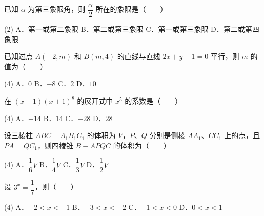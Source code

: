 
\begin{question}
已知 $\alpha$ 为第三象限角，则 $\dfrac{\alpha}{2}$ 所在的象限是\mbox{（　　）}

\begin{gkopts}(2)
\task A．第一或第二象限
\task B．第二或第三象限
\task C．第一或第三象限
\task D．第二或第四象限
\end{gkopts}

\end{question}
\begin{question}
已知过点 $A(-2, m)$ 和 $B(m, 4)$ 的直线与直线 $2x + y - 1 = 0$ 平行，则 $m$ 的值为\mbox{（　　）}

\begin{gkopts}(4)
\task A．$0$
\task B．$-8$
\task C．$2$
\task D．$10$
\end{gkopts}

\end{question}
\begin{question}
在 $(x - 1)(x + 1)^8$ 的展开式中 $x^5$ 的系数是\mbox{（　　）}

\begin{gkopts}(4)
\task A．$-14$
\task B．$14$
\task C．$-28$
\task D．$28$
\end{gkopts}

\end{question}
\begin{question}
设三棱柱 $ABC - A_1B_1C_1$ 的体积为 $V$，$P$、$Q$ 分别是侧棱 $AA_1$、$CC_1$ 上的点，且 $PA = QC_1$，则四棱锥 $B - APQC$ 的体积为\mbox{（　　）}

\begin{gkopts}(4)
\task A．$\dfrac{1}{6}V$
\task B．$\dfrac{1}{4}V$
\task C．$\dfrac{1}{3}V$
\task D．$\dfrac{1}{2}V$
\end{gkopts}

\end{question}
\begin{question}
设 $3^x = \dfrac{1}{7}$，则\mbox{（　　）}

\begin{gkopts}(4)
\task A．$-2 < x < -1$
\task B．$-3 < x < -2$
\task C．$-1 < x < 0$
\task D．$0 < x < 1$
\end{gkopts}

\end{question}
